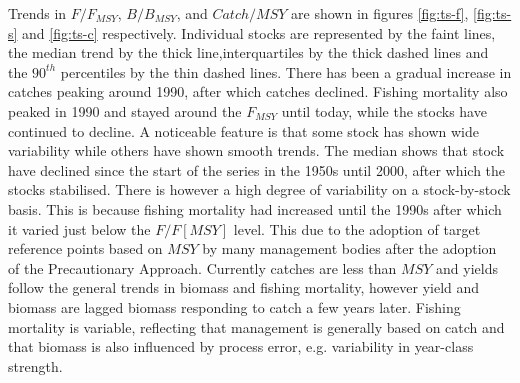 Trends in  $F/F_{MSY}$, $B/B_{MSY}$, and $Catch/MSY$ are shown in figures \ref{fig:ts-f}, \ref{fig:ts-s} and \ref{fig:ts-c} respectively. Individual stocks are represented by the faint lines, the median trend by the thick line,interquartiles by the thick dashed lines and the $90^{th}$ percentiles by the thin dashed lines.  There has been a gradual increase in catches peaking around 1990, after which catches declined. Fishing mortality also peaked in 1990 and stayed around the $F_{MSY}$ until today, while the stocks have continued to decline. A noticeable feature is that some stock has shown wide variability while others have shown smooth trends. The median shows that stock have declined since the start of the series in the 1950s until 2000, after which the stocks stabilised. There is however a high degree of variability on a stock-by-stock basis. This is because fishing mortality had increased until the 1990s after which it varied just below the $F/F[MSY]$ level. This due to the adoption of target reference points based on $MSY$ by many management bodies after the adoption of the Precautionary Approach. Currently catches are less than $MSY$  and yields follow the general trends in biomass and fishing mortality, however yield and biomass are lagged biomass responding to catch a few years later. Fishing mortality is variable, reflecting that management is generally based on catch and that biomass is also influenced by process error, e.g. variability in year-class strength.  
